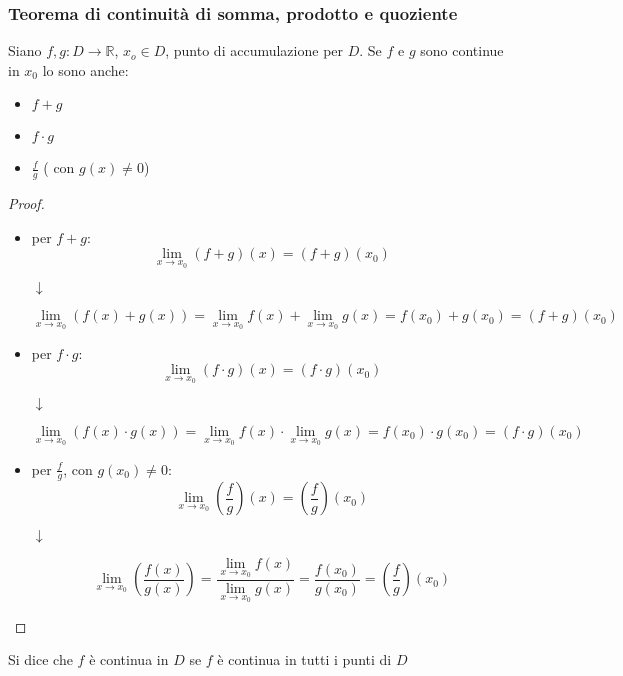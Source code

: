 \documentclass[a4paper,12pt, oneside]{book}
\begin{document}
\subsubsection{Teorema di continuità di somma, prodotto e quoziente}
\begin{teorema}
	Siano $f,g:D\rightarrow \mathbb{R}$, $x_o\in D$, punto  di accumulazione per $D$. Se $f$ e $g$ sono continue in $x_0$ lo sono anche:
	\begin{itemize}
		\item $f+g$
		\item $f\cdot g$
		\item $\frac{f}{g}$ ( con $g(x)\neq 0$)
	\end{itemize}
\end{teorema}
\begin{proof}
	\begin{itemize}
		\item per $f+g$:
		      $$\lim_{x\rightarrow x_0} (f+g)(x)=(f+g)(x_0)$$
		      \begin{center}$\downarrow$ \end{center}
		      $$\lim_{x\rightarrow x_0} (f(x)+g(x))=\lim_{x\rightarrow x_0} f(x)+\lim_{x\rightarrow x_0} g(x)=f(x_0)+g(x_0)=(f+g)(x_0)$$
		\item per $f\cdot g$:
		      $$\lim_{x\rightarrow x_0} (f\cdot g)(x)=(f\cdot g)(x_0)$$
		      \begin{center}$\downarrow$ \end{center}
		      $$\lim_{x\rightarrow x_0} (f(x)\cdot g(x))=\lim_{x\rightarrow x_0} f(x)\cdot \lim_{x\rightarrow x_0} g(x)=f(x_0)\cdot g(x_0)=(f\cdot g)(x_0)$$
		\item per $\frac{f}{g}$, con $g(x_0)\neq 0$:
		      $$\lim_{x\rightarrow x_0} \left(\frac{f}{g}\right)(x)=\left(\frac{f}{g}\right)(x_0)$$
		      \begin{center}$\downarrow$ \end{center}
		      $$\lim_{x\rightarrow x_0} \left(\frac{f(x)}{g(x)}\right)=\frac{\lim_{x\rightarrow x_0} f(x)}{\lim_{x\rightarrow x_0} g(x)}=\frac{f(x_0)}{g(x_0)}=\left(\frac{f}{g}\right)(x_0)$$
	\end{itemize}
\end{proof}
\begin{definizione}
	Si dice che $f$ è continua in $D$ se $f$ è continua in tutti i punti di $D$
\end{definizione}
\end{document}
